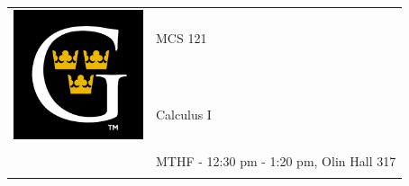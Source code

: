 \documentclass[11pt]{article}
\begin{document}
\begin{tabular}{ l l }
 \multirow{3}{*}{\includegraphics[height=1.5in,width=1.5in]{GAC_logo.png}} & \LARGE MCS 121 \\\\
  & \LARGE  Calculus I \\\\
  & \LARGE MTHF - 12:30 pm - 1:20 pm, Olin Hall 317 \\\\
\end{tabular}
\vspace{10mm}
\end{document}

